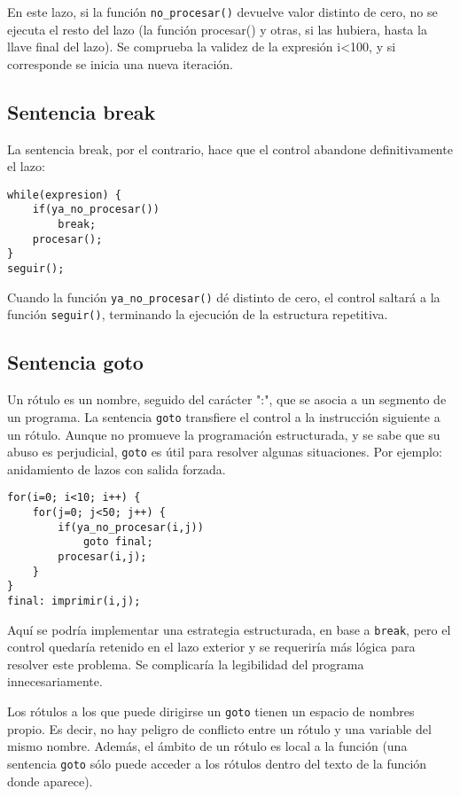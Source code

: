 En este lazo, si la función \lstinline{no_procesar()} devuelve valor distinto de cero, no
se ejecuta el resto del lazo (la función procesar() y otras, si las hubiera,
hasta la llave final del lazo). Se comprueba la validez de la expresión i<100,
y si corresponde se inicia una nueva iteración.

\subsection{Sentencia break}
La sentencia break, por el contrario, hace que el control abandone
definitivamente el lazo:
\begin{lstlisting}
while(expresion) {
    if(ya_no_procesar())
        break;
    procesar();
}
seguir();
\end{lstlisting}

Cuando la función \lstinline{ya_no_procesar()} dé distinto de cero, el control saltará a la
función \lstinline{seguir()}, terminando la ejecución de la estructura repetitiva.

\subsection{Sentencia goto}
Un rótulo es un nombre, seguido del carácter ":", que se asocia a un segmento
de un programa. La sentencia \lstinline{goto} transfiere el control a la instrucción
siguiente a un rótulo. Aunque no promueve la programación estructurada, y se
sabe que su abuso es perjudicial, \lstinline{goto} es útil para resolver algunas
situaciones. Por ejemplo: anidamiento de lazos con salida forzada.
\begin{lstlisting}
for(i=0; i<10; i++) {
    for(j=0; j<50; j++) {
        if(ya_no_procesar(i,j))
            goto final;
        procesar(i,j);
    }
}
final: imprimir(i,j);
\end{lstlisting}

Aquí se podría implementar una estrategia estructurada, en base a \lstinline{break}, pero
el control quedaría retenido en el lazo exterior y se requeriría más lógica
para resolver este problema. Se complicaría la legibilidad del programa
innecesariamente.

Los rótulos a los que puede dirigirse un \lstinline{goto} tienen un espacio de nombres
propio. Es decir, no hay peligro de conflicto entre un rótulo y una variable
del mismo nombre. Además, el ámbito de un rótulo es local a la función (una
sentencia \lstinline{goto} sólo puede acceder a los rótulos dentro del texto de la función
donde aparece).

